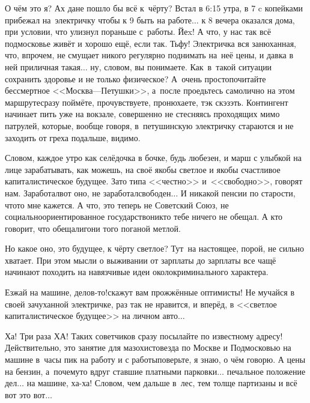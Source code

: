 О чём это я? Ах да\mdash не пошло бы всё к~чёрту? Встал в 6:15 утра, в 7 c копейками прибежал на~электричку чтобы к 9 быть на работе$\ldots$ к 8 вечера оказался дома, при условии, что улизнул пораньше с~работы. Йеx! А что, у нас так всё подмосковье живёт и хорошо ещё, если так. Тьфу! Электричка вся занюханная, что, впрочем, не смущает никого регулярно поднимать на~неё цены, и давка в ней приличная такая$\ldots$ ну, словом, вы понимаете. Как~в~такой ситуации сохранить здоровье и не только физическое? А~очень просто\mdash почитайте бессмертное <<Москва\thinspace\nobreakdash---\thinspace Петушки>>\cite{МоскваПетушки}, а~после проедьтесь самолично на этом маршруте\mdash сразу поймёте, прочувствуете, пронюхаете, тэк скэзэть. Контингент начинает пить уже на вокзале, совершенно не стесняясь проходящих мимо патрулей, которые, вообще говоря, в~петушинскую электричку стараются и не заходить от греха подальше, видимо.

Словом, каждое утро как селёдочка в бочке, будь любезен, и марш с улыбкой на лице зарабатывать, как можешь, на своё якобы светлое и якобы счастливое капиталистическое будущее. Зато типа <<честно>> и~<<свободно>>, говорят нам. Заработал\mdash вот оно, не заработал\mdash свободен$\ldots$ И никакой пенсии по старости, что\sdash то мне кажется. А что, это теперь не Советский Союз, не социально\sdash ориентированное государство\mdash никто тебе ничего не обещал. А кто говорит, что обещали\mdash гони того поганой метлой.

Но какое оно, это будущее, к чёрту светлое? Тут~на настоящее, порой, не сильно хватает. 
При этом мысли о выживании от зарплаты до зарплаты все чащё начинают походить на навязчивые идеи околокриминального характера.

\diagdash Езжай на машине, делов-то!\mdash скажут вам прожжённые оптимисты! \mdash Не мучайся в своей зачуханной электричке, раз так не нравится, и вперёд, в <<светлое капиталистическое будущее>> на личном авто$\ldots$ 

Ха! Три раза ХА! Таких советчиков сразу посылайте по известному адресу! Действительно, это занятие для мазохистов\mdash езда по Москве и Подмосковью на машине в~часы пик на работу и с работы\mdash поверьте, я знаю, о чём говорю. А цены на бензин, а~почему\sdash то вдруг ставшие платными парковки$\ldots$ печальное положение дел$\ldots$ на машине, ха-ха! Словом, чем дальше в~лес, тем толще партизаны и всё вот это вот$\ldots$%

